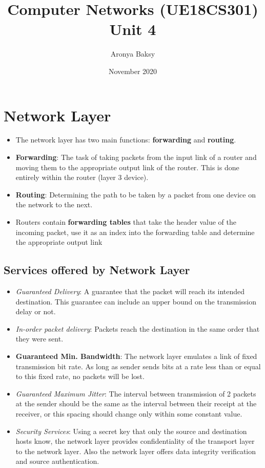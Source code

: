 \documentclass[a4paper]{article}
\title{Computer Networks (UE18CS301)\\
 \large Unit 4
 }
\author{Aronya Baksy}
\date{November 2020}
\theoremstyle{plain}
\theoremstyle{definition}
\begin{document}
\maketitle

\section{Network Layer}
\begin{itemize}
    \item The network layer has two main functions: \textbf{forwarding} and \textbf{routing}.
    
    \item \textbf{Forwarding}: The task of taking packets from the input link of a router and moving them to the appropriate output link of the router. This is done entirely within the router (layer 3 device).
    
    \item \textbf{Routing}: Determining the path to be taken by a packet from one device on the network to the next.
    
    \item Routers contain \textbf{forwarding tables }that take the header value of the incoming packet, use it as an index into the forwarding table and determine the appropriate output link 
\end{itemize}

\subsection{Services offered by Network Layer}
\begin{itemize}
    \item \textit{Guaranteed Delivery}: A guarantee that the packet will reach its intended destination. This guarantee can include an upper bound on the transmission delay or not. 
    
    \item \textit{In-order packet delivery}: Packets reach the destination in the same order that they were sent.
    
    \item \textbf{Guaranteed Min. Bandwidth}: The network layer emulates a link of fixed transmission bit rate. As long as sender sends bits at a rate less than or equal to this fixed rate, no packets will be lost. 
    
    \item \textit{Guaranteed Maximum Jitter}: The interval between transmission of 2 packets at the sender should be the same as the interval between their receipt at the receiver, or this spacing should change only within some constant value. 
    
    \item \textit{Security Services}: Using a secret key that only the source and destination hosts know, the network layer provides confidentiality of the transport layer to the network layer. Also the network layer offers data integrity verification and source authentication.  
\end{itemize}
\end{document}
